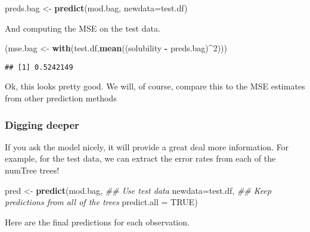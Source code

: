 \documentclass[]{article}
\newenvironment{Shaded}{\begin{snugshade}}{\end{snugshade}}
\newcommand{\CommentTok}[1]{\textcolor[rgb]{0.56,0.35,0.01}{\textit{#1}}}
\newcommand{\DataTypeTok}[1]{\textcolor[rgb]{0.13,0.29,0.53}{#1}}
\newcommand{\DecValTok}[1]{\textcolor[rgb]{0.00,0.00,0.81}{#1}}
\newcommand{\KeywordTok}[1]{\textcolor[rgb]{0.13,0.29,0.53}{\textbf{#1}}}
\newcommand{\NormalTok}[1]{#1}
\newcommand{\OperatorTok}[1]{\textcolor[rgb]{0.81,0.36,0.00}{\textbf{#1}}}
\newcommand{\OtherTok}[1]{\textcolor[rgb]{0.56,0.35,0.01}{#1}}
\newcommand{\StringTok}[1]{\textcolor[rgb]{0.31,0.60,0.02}{#1}}
\begin{document}
\begin{Shaded}
\begin{Highlighting}[]
\NormalTok{preds.bag <-}\StringTok{ }\KeywordTok{predict}\NormalTok{(mod.bag,}
                     \DataTypeTok{newdata=}\NormalTok{test.df)}
\end{Highlighting}
\end{Shaded}

And computing the MSE on the test data.

\begin{Shaded}
\begin{Highlighting}[]
\NormalTok{(mse.bag <-}\StringTok{ }\KeywordTok{with}\NormalTok{(test.df,}\KeywordTok{mean}\NormalTok{((solubility }\OperatorTok{-}\StringTok{ }\NormalTok{preds.bag)}\OperatorTok{^}\DecValTok{2}\NormalTok{)))}
\end{Highlighting}
\end{Shaded}

\begin{verbatim}
## [1] 0.5242149
\end{verbatim}

Ok, this looks pretty good. We will, of course, compare this to the MSE
estimates from other prediction methods

\hypertarget{digging-deeper}{%
\subsubsection{Digging deeper}\label{digging-deeper}}

If you ask the model nicely, it will provide a great deal more
information. For example, for the test data, we can extract the error
rates from each of the numTree trees!

\begin{Shaded}
\begin{Highlighting}[]
\NormalTok{pred <-}\StringTok{ }\KeywordTok{predict}\NormalTok{(mod.bag,}
                \CommentTok{## Use test data}
                \DataTypeTok{newdata=}\NormalTok{test.df,}
                \CommentTok{## Keep predictions from all of the trees}
                \DataTypeTok{predict.all =} \OtherTok{TRUE}\NormalTok{) }
\end{Highlighting}
\end{Shaded}

Here are the final predictions for each observation.

\begin{Shaded}
\end{Shaded}
\end{document}
